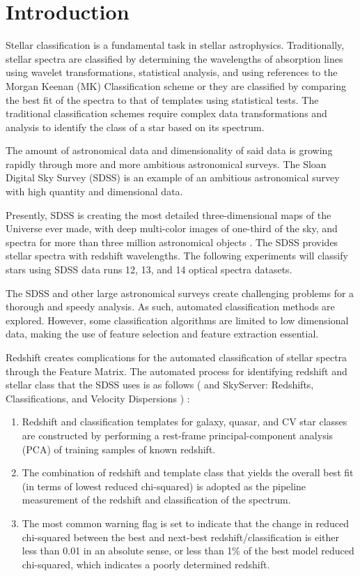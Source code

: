\documentclass[./AutomatedMK.tex]{subfiles}
\begin{document}
\section{Introduction}\label{sec:intro}

Stellar classification is a fundamental task in stellar astrophysics. Traditionally, stellar spectra are classified by determining the wavelengths of absorption lines using wavelet transformations, statistical analysis, and using references to the Morgan Keenan (MK) Classification scheme \citep{MorganKeenan} or they are classified by comparing the best fit of the spectra to that of templates using statistical tests. The traditional classification schemes require complex data transformations and analysis to identify the class of a star based on its spectrum.

The amount of astronomical data and dimensionality of said data is growing rapidly through more and more ambitious astronomical surveys. The Sloan Digital Sky Survey (SDSS) is an example of an ambitious astronomical survey with high quantity and dimensional data. 

Presently, SDSS is creating the most detailed three-dimensional maps of the Universe ever made, with deep multi-color images of one-third of the sky, and spectra for more than three million astronomical objects \citep{York, sdss}. The SDSS provides stellar spectra with redshift wavelengths. The following experiments will classify stars using SDSS data runs 12, 13, and 14 optical spectra datasets. 

The SDSS and other large astronomical surveys create challenging problems for a thorough and speedy analysis. As such, automated classification methods are explored. However, some classification algorithms are limited to low dimensional data, making the use of feature selection and feature extraction essential.

Redshift creates complications for the automated classification of stellar spectra through the Feature Matrix. The automated process for identifying redshift and stellar class that the SDSS uses is as follows (\citeauthor{Bolton} and SkyServer: Redshifts, Classifications, and Velocity Dispersions \citep{RedClass}) :

\begin{enumerate}

\item Redshift and classification templates for galaxy, quasar, and CV star classes are constructed by performing a rest-frame principal-component analysis (PCA) of training samples of known redshift.
\item The combination of redshift and template class that yields the overall best fit (in terms of lowest reduced chi-squared) is adopted as the pipeline measurement of the redshift and classification of the spectrum.
\item The most common warning flag is set to indicate that the change in reduced chi-squared between the best and next-best redshift/classification is either less than 0.01 in an absolute sense, or less than 1\% of the best model reduced chi-squared, which indicates a poorly determined redshift.

\end{enumerate}
\end{document}
